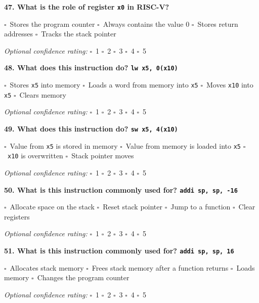 \documentclass[12pt,a4paper]{article}
\newcommand{\boxmark}{\(\square\)}
\newcommand{\confidenceoptional}{%
    \textit{Optional confidence rating:} \boxmark\ 1 \hspace{1em} \boxmark\ 2 \hspace{1em} \boxmark\ 3 \hspace{1em} \boxmark\ 4 \hspace{1em} \boxmark\ 5
}
\begin{document}
\textbf{47. What is the role of register \texttt{x0} in RISC-V?}

\boxmark\ Stores the program counter \hspace{1em}
\boxmark\ Always contains the value 0 \hspace{1em}
\boxmark\ Stores return addresses \hspace{1em}
\boxmark\ Tracks the stack pointer

\confidenceoptional

\textbf{48. What does this instruction do? \texttt{lw x5, 0(x10)}}

\boxmark\ Stores \texttt{x5} into memory \hspace{1em}
\boxmark\ Loads a word from memory into \texttt{x5} \hspace{1em}
\boxmark\ Moves \texttt{x10} into \texttt{x5} \hspace{1em}
\boxmark\ Clears memory

\confidenceoptional

\textbf{49. What does this instruction do? \texttt{sw x5, 4(x10)}}

\boxmark\ Value from \texttt{x5} is stored in memory \hspace{1em}
\boxmark\ Value from memory is loaded into \texttt{x5} \hspace{1em}
\boxmark\ \texttt{x10} is overwritten \hspace{1em}
\boxmark\ Stack pointer moves

\confidenceoptional

\textbf{50. What is this instruction commonly used for? \texttt{addi sp, sp, -16}}

\boxmark\ Allocate space on the stack \hspace{1em}
\boxmark\ Reset stack pointer \hspace{1em}
\boxmark\ Jump to a function \hspace{1em}
\boxmark\ Clear registers

\confidenceoptional

\textbf{51. What is this instruction commonly used for? \texttt{addi sp, sp, 16}}

\boxmark\ Allocates stack memory \hspace{1em}
\boxmark\ Frees stack memory after a function returns \hspace{1em}
\boxmark\ Loads memory \hspace{1em}
\boxmark\ Changes the program counter

\confidenceoptional
\end{document}
